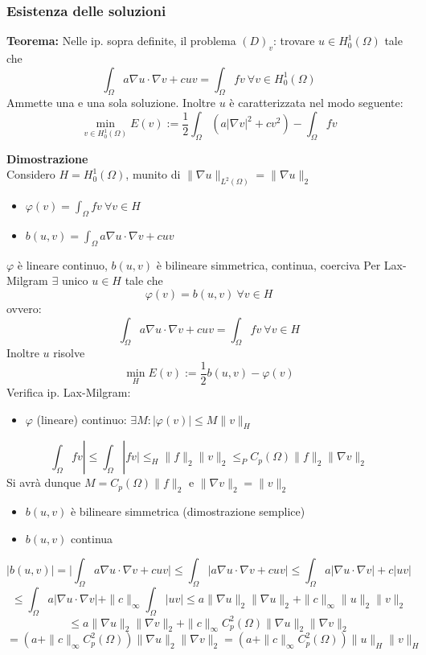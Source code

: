\documentclass[a4paper]{article}
\begin{document}
\subsubsection{Esistenza delle soluzioni}
\begin{tcolorbox}
	\textbf{Teorema: }Nelle ip. sopra definite, il problema $(D)_v$: trovare $u\in H_0^1(\Omega)$ tale che
	\[\int_{\Omega}^{} a\nabla u\cdot \nabla v+cuv=\int_{\Omega}^{} fv\ \forall v\in H_0^1(\Omega)\]
	Ammette una e una sola soluzione. Inoltre $u$ è caratterizzata nel modo seguente:
	\[\min_{v\in H_0^1(\Omega)}E(v):=\frac{1}{2}\int_{\Omega}^{} (a|\nabla v|^2+cv^2)-\int_{\Omega}^{} fv\]

\end{tcolorbox}
\textbf{Dimostrazione} 
\\Considero $H=H^1_0(\Omega)$, munito di $\|\nabla u\|_{L^{2}(\Omega)}=\|\nabla u\|_2$
\begin{itemize}
	\item $\varphi(v)=\int_{\Omega}^{} fv\ \forall v\in H $ 
	\item $b(u,v)=\int_{\Omega}^{} a\nabla u\cdot \nabla v+cuv $ 

\end{itemize}
$\varphi$ è lineare continuo, $b(u,v)$ è bilineare simmetrica, continua, coerciva
Per Lax-Milgram $\exists $ unico $u\in H$ tale che 
\[\varphi(v)=b(u,v)\ \forall v\in H\]
ovvero:
\[\int_{\Omega}^{} a\nabla u\cdot \nabla v +cuv=\int_{\Omega}^{}fv \ \forall v\in H\]
Inoltre $u$ risolve
\[\min_{H}E(v):=\frac{1}{2}b(u,v)-\varphi(v)\]
Verifica ip. Lax-Milgram:
\begin{itemize}
	\item $\varphi$ (lineare) continuo: $\exists M:|\varphi(v)|\le M\|v\|_H$
\end{itemize}
\[\int_{\Omega}^{} fv|\le \int_{\Omega}^{} |fv|\le_H\|f\|_2\|v\|_2\le_PC_p(\Omega)\|f\|_2\|\nabla v\|_2\]
Si avrà dunque $M=C_p(\Omega)\|f\|_2$ e $\|\nabla v\|_2=\|v\|_2$
\begin{itemize}
	\item $b(u,v)$ è bilineare simmetrica (dimostrazione semplice)
\end{itemize}
\begin{itemize}
	\item $b(u,v)$ continua

\end{itemize}
\[|b(u,v)|=\bigg|\int_{\Omega}^{} a\nabla u\cdot \nabla v+cuv\bigg|\le \int_{\Omega}^{} |a\nabla u\cdot \nabla v+cuv|\le \int_{\Omega}^{} a|\nabla u\cdot \nabla v|+c|uv| \]
\[\le \int_{\Omega}^{} a|\nabla u\cdot \nabla v|+\|c\|_{\infty}\int_{\Omega}^{} |uv|   \le a \|\nabla u\|_2 \|\nabla u\|_2+\|c\|_\infty\|u\|_2\|v\|_2\]
\[\le a \|\nabla u\|_2\|\nabla v\|_2+\|c\|_\infty C_p^2(\Omega)\|\nabla u\|_2\|\nabla v\|_2\]
\[=(a+\|c\|_\infty C^2_p(\Omega))\|\nabla u\|_2\|\nabla v\|_2=(a+\|c\|_\infty C^2_p(\Omega))\|u\|_H\|v\|_H\]
\end{document}
